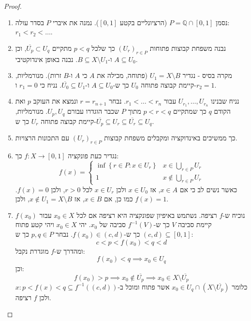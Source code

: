 \documentclass{tstextbook}
\begin{document}
\begin{proof}
  \begin{enumerate}
    \item נסמן \(P = \mathbb{Q} \cap [0,1]\) (הרציונליים בקטע \([0,1]\)). נמנה את איברי \(P\) בסדר עולה: \(r_1 < r_2 < \dots\). 


    \item נבנה משפחת קבוצות פתוחות \((U_r)_{r \in P}\) כך שלכל \(p < q\) מתקיים \(\overline{U_p} \subset U_q\), וכן \(A \subseteq U_0\) ו-\(B \subseteq X \setminus U_1\). נבנה באופן אינדוקטיבי. 


    \item מקרה בסיס - נגדיר \(U_1 = X \setminus B\) (פתוחה, מכילה את \(A\) כי \(A\) ו-\(B\) זרות). מנורמליות, קיימת קבוצה פתוחה \(U_0\) כך ש-\(A \subseteq U_0\) ו-\(\overline{U_0} \subseteq U_1\). נניח כי \(r_{1}=0\) ו-\(r_{2}=1\). 


    \item נניח שבנינו \(U_{r_1}, \dots, U_{r_n}\) עבור \(r_1 < \dots < r_n\). נבחר \(r = r_{n+1}\) ונמצא את העוקב \(p\) ואת הקודם \(q\) כך שמתקיים  \(p < r < q\) מתוך \(P\) שכבר הוגדרו עבורם \(U_p, U_q\). מנורמליות, קיימת קבוצה פתוחה \(U_r\) כך ש-\(\overline{U_p} \subseteq U_r \subseteq \overline{U_r} \subseteq U_q\). 


    \item כך ממשיכים באינדוקציה ומקבלים משפחת קבוצות \((U_r)_{r \in P}\) עם התכונות הרצויות. 


    \item נגדיר כעת פונקציה \(f : X \to [0,1]\) כך: 
$$f(x) =\begin{cases}\inf \left\{  r \in P : x \in U_r  \right\} & x \in \bigcup_{r \in P}U_{r} \\1 & x \not  \in \bigcup_{r \in P}U_{r}
\end{cases}$$
כאשר נשים לב כי אם \(x \in A\), אז \(x \in U_0\) ולכן \(x \in U_r\) לכל \(r > 0\), ולכן \(f(x) = 0\). כמו כן, אם \(x \in B\), אז \(x \notin U_1 = X \setminus B\), ולכן \(f(x) = 1\).


    \item נוכיח ש-\(f\) רציפה. נשתמש באיפיון שפונקציה היא רציפה אם לכל \(x_{0}\in X\) עבור \(f(x_{0})\) קיימת סביבה \(V\) כך ש-\(f ^{-1}(V)\) סביבה של \(x_{0}\). יהי \(x_0 \in X\) ויהי קטע פתוח \((c, d) \subseteq [0,1]\) כך ש-\(f(x_0) \in (c, d)\). נבחר \(p, q \in P\) כך ש: 
$$c<p<f(x_{0})<q<d$$
ומהדרך ש-\(f\) מוגדרת נקבל:
$$f(x_0) < q \implies x_0 \in U_q$$
וכן:
$$f(x_0) > p \implies x_0 \notin \overline{U_p} \implies x_0 \in X \setminus \overline{U_p}$$
כלומר \(x_{0}\in U_{q}\cap\left(X\setminus{\overline{{U_{p}}}}\right)\) אשר פתוח ומוכל ב-\({x : p < f(x) < q} \subseteq f^{-1}((c,d))\) ולכן \(f\) רציפה.


  \end{enumerate}
\end{proof}
\end{document}
